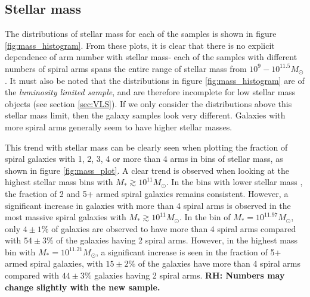 \documentclass[useAMS,usenatbib]{mn2e}
\newcommand{\rh}[1]{{\bf \textcolor{RoyalPurple}{RH: #1}}}
\begin{document}
\subsection{Stellar mass}
\label{sec:mass}

The distributions of stellar mass for each of the samples is shown in figure \ref{fig:mass_histogram}. From these plots, it is clear that there is no explicit dependence of arm number with stellar mass- each of the samples with different numbers of spiral arms spans the entire range of stellar mass from $10^{9} - 10^{11.5} M_{\odot}$. It must also be noted that the distributions in figure \ref{fig:mass_histogram} are of the \textit{luminosity limited sample}, and are therefore incomplete for low stellar mass objects (see section \ref{sec:VLS}). If we only consider the distributions above this stellar mass limit, then the galaxy samples look very different. Galaxies with more spiral arms generally seem to have higher stellar masses. 

This trend with stellar mass can be clearly seen when plotting the fraction of spiral galaxies with 1, 2, 3, 4 or more than 4 arms in bins of stellar mass, as shown in figure \ref{fig:mass_plot}. A clear trend is observed when looking at the highest stellar mass bins with $M_* \gtrsim 10^{11} M_{\odot}$. In the bins with lower stellar mass , the fraction of 2 and 5+ armed spiral galaxies remains consistent. However, a significant increase in galaxies with more than 4 spiral arms is observed in the most massive spiral galaxies with $M_* \gtrsim 10^{11} M_{\odot}$. In the bin of $M_* = 10^{11.97}M_{\odot}$, only $4 \pm 1 \%$ of galaxies are observed to have more than 4 spiral arms compared with $54 \pm 3 \%$ of the galaxies having 2 spiral arms. However, in the highest mass bin with $M_* = 10^{11.21}M_{\odot}$, a significant increase is seen in the fraction of 5+ armed spiral galaxies, with $15 \pm 2 \%$ of the galaxies have more than 4 spiral arms compared with $44 \pm 3 \%$ galaxies having 2 spiral arms. \rh{Numbers may change slightly with the new sample.}
\end{document}
